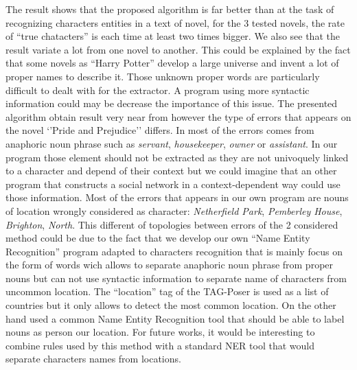 \documentclass[a4paper, 12pt]{report}
\begin{document}
\begin{table}
\center
\caption{Number of detected character that refers to actual characters(true positive).}\label{tab1}

\end{table}


The result shows that the proposed algorithm is far better than \cite{original} at the task of recognizing characters entities in a text of
 novel, for the 3 tested novels, the rate of ``true chatacters'' is each time at least two times bigger. We also see that the result variate
 a lot from one novel to another. This could be explained by the fact that some novels as ``Harry Potter'' develop a large universe and invent a lot of proper names to describe it. Those unknown proper words are particularly difficult to dealt with for the extractor. A program using more syntactic information could may be decrease the importance of this issue. The presented algorithm obtain result very near from \cite{character_meta} however the type of errors that appears on the novel `'Pride and Prejudice'' differs. In \cite{character_meta} most of the errors comes from anaphoric noun phrase such as \textit{servant},  \textit{housekeeper},  \textit{owner} or \textit{assistant}. In our program those element should not be extracted as they are not univoquely linked to a character and depend of their context but we could imagine that an other program that constructs a social network in a context-dependent way could use those information. Most of the errors that appears in our own  program are nouns of location wrongly considered as character: \textit{Netherfield Park}, \textit{Pemberley House}, \textit{Brighton}, \textit{North}. This different of topologies between errors of the 2 considered method could be due to the fact that we develop our own ``Name Entity Recognition'' program adapted to characters recognition that is mainly focus on the form of words wich allows to separate anaphoric noun phrase from proper nouns but can not use syntactic information to separate name of characters from uncommon location. The ``location'' tag of the TAG-Poser is used as a list of countries but it only allows to detect the most common location. On the other hand \cite{structure_clustering} used a common Name Entity Recognition tool that should be able to label nouns as person our location. For future works, it would be interesting to combine rules used by this method with a standard NER tool that would separate characters names from locations. \\
\end{document}
